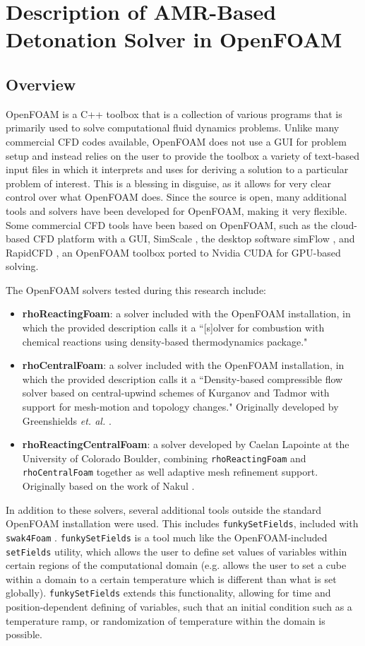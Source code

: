 \chapter{Description of AMR-Based Detonation Solver in OpenFOAM}
\label{math}

\section{Overview}
OpenFOAM \cite{weller} is a C++ toolbox that is a collection of various programs that is primarily used to solve computational fluid dynamics problems. Unlike many commercial CFD codes available, OpenFOAM does not use a GUI for problem setup and instead relies on the user to provide the toolbox a variety of text-based input files in which it interprets and uses for deriving a solution to a particular problem of interest. This is a blessing in disguise, as it allows for very clear control over what OpenFOAM does. Since the source is open, many additional tools and solvers have been developed for OpenFOAM, making it very flexible. Some commercial CFD tools have been based on OpenFOAM, such as the cloud-based CFD platform with a GUI, SimScale \cite{simscale}, the desktop software simFlow \cite{simflow}, and RapidCFD \cite{rapidcfd}, an OpenFOAM toolbox ported to Nvidia CUDA \cite{cuda} for GPU-based solving. 

The OpenFOAM solvers tested during this research include:
\begin{itemize}
    \item \textbf{rhoReactingFoam}: a solver included with the OpenFOAM installation, in which the provided description calls it a ``[s]olver for combustion with chemical reactions using density-based thermodynamics package."
    \item \textbf{rhoCentralFoam}: a solver included with the OpenFOAM installation, in which the provided description calls it a ``Density-based compressible flow solver based on central-upwind schemes of Kurganov and Tadmor with support for mesh-motion and topology changes." Originally developed by Greenshields \textit{et. al.} \cite{greenshields}. 
    \item \textbf{rhoReactingCentralFoam}: a solver developed by Caelan Lapointe at the University of Colorado Boulder, combining \verb|rhoReactingFoam| and \verb|rhoCentralFoam| together as well adaptive mesh refinement support. Originally based on the work of Nakul \cite{nakul}. 
\end{itemize}
In addition to these solvers, several additional tools outside the standard OpenFOAM installation were used. This includes \verb|funkySetFields|, included with \verb|swak4Foam| \cite{swak4foam}. \verb|funkySetFields| is a tool much like the OpenFOAM-included \verb|setFields| utility, which allows the user to define set values of variables within certain regions of the computational domain (e.g. allows the user to set a cube within a domain to a certain temperature which is different than what is set globally). \verb|funkySetFields| extends this functionality, allowing for time and position-dependent defining of variables, such that an initial condition such as a temperature ramp, or randomization of temperature within the domain is possible. 

